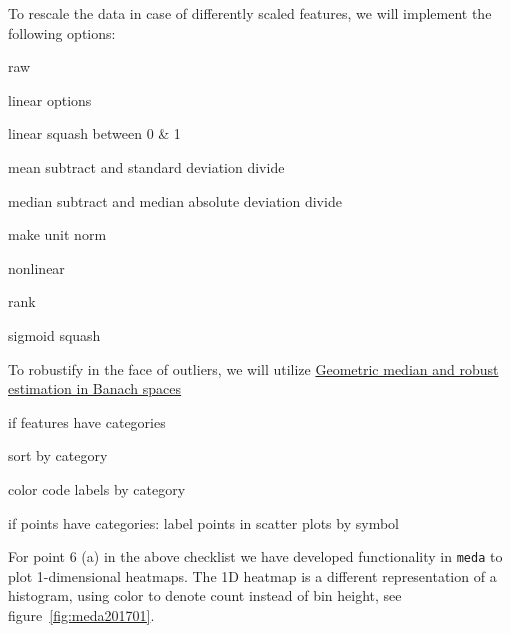 \documentclass[simplex.tex]{subfiles}
\begin{document}
\begin{compactitem}
\item To rescale the data in case of differently scaled features, we will implement the following options: 
\begin{compactitem}
  \item raw
  \item linear options
  \begin{compactitem}
    \item linear squash between 0 \& 1
    \item mean subtract and standard deviation divide
    \item median subtract and median absolute deviation divide
    \item make unit norm
  \end{compactitem}
  \item nonlinear
  \begin{compactitem}
    \item rank
    \item sigmoid squash
  \end{compactitem}
\end{compactitem}

\item To robustify in the face of outliers, we will utilize
 \href{http://projecteuclid.org/euclid.bj/1438777595}{Geometric median and robust estimation in Banach spaces} 

\item { if features have categories}
\begin{compactenum}
  \item sort by category
  \item color code labels by category
\end{compactenum}

\item { if points have categories}: 
   label points in scatter plots by symbol
\end{compactitem}

\vspace{12pt}

For point 6 (a) in the above checklist we have developed functionality
in \verb+meda+ to plot 1-dimensional heatmaps.  The 1D heatmap is
a different representation of a histogram, using color to denote count
instead of bin height, see figure~\ref{fig:meda201701}.
\end{document}
